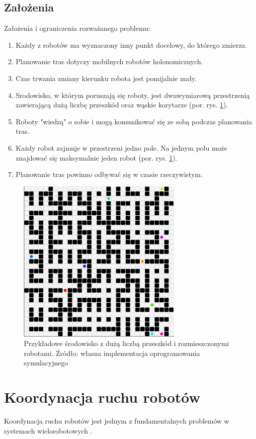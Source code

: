 \subsection{Założenia}
\label{ch:zalozenia}
Założenia i ograniczenia rozważanego problemu:
\begin{enumerate}
	\item Każdy z robotów ma wyznaczony inny punkt docelowy, do którego zmierza.
	\item Planowanie tras dotyczy mobilnych robotów holonomicznych.
	\item Czas trwania zmiany kierunku robota jest pomijalnie mały.
	\item Srodowisko, w którym poruszają się roboty, jest dwuwymiarową przestrzenią zawierającą dużą liczbę przeszkód oraz wąskie korytarze (por. rys. \ref{fig:img_robopath_sample-maze}).
	\item Roboty "wiedzą" o sobie i mogą komunikować się ze sobą podczas planowania tras.
	\item Każdy robot zajmuje w przestrzeni jedno pole. Na jednym polu może znajdować się maksymalnie jeden robot (por. rys. \ref{fig:img_robopath_sample-maze}).
	\item Planowanie tras powinno odbywać się w czasie rzeczywistym.
\end{enumerate}

\begin{figure}[H]
	\centering
	\includegraphics[width=8cm]{img/robopath/sample-maze}
	\caption{Przykładowe środowisko z dużą liczbą przeszkód i rozmieszczonymi robotami. Źródło: własna implementacja oprogramowania symulacyjnego}
	\label{fig:img_robopath_sample-maze}
\end{figure}


\clearpage
\section{Koordynacja ruchu robotów}
Koordynacja ruchu robotów jest jednym z fundamentalnych problemów w systemach wielorobotowych \cite{optpriorities}.

